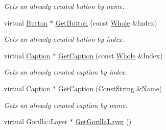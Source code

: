 \begin{DoxyCompactItemize}
\begin{DoxyCompactList}\small\item\em Gets an already created button by name. \item\end{DoxyCompactList}\item 
virtual \hyperlink{classMezzanine_1_1UI_1_1Button}{Button} $\ast$ \hyperlink{classMezzanine_1_1UI_1_1Layer_acfbea2afd6cf9a1509d72d39715ebf05}{GetButton} (const \hyperlink{namespaceMezzanine_adcbb6ce6d1eb4379d109e51171e2e493}{Whole} \&Index)
\begin{DoxyCompactList}\small\item\em Gets an already created button by index. \item\end{DoxyCompactList}\item 
virtual \hyperlink{classMezzanine_1_1UI_1_1Caption}{Caption} $\ast$ \hyperlink{classMezzanine_1_1UI_1_1Layer_a0e85f5557ad863eefa81dd42ca9eb45d}{GetCaption} (const \hyperlink{namespaceMezzanine_adcbb6ce6d1eb4379d109e51171e2e493}{Whole} \&Index)
\begin{DoxyCompactList}\small\item\em Gets an already created caption by index. \item\end{DoxyCompactList}\item 
virtual \hyperlink{classMezzanine_1_1UI_1_1Caption}{Caption} $\ast$ \hyperlink{classMezzanine_1_1UI_1_1Layer_ad862a32c94f66dbc749575bb103fc0db}{GetCaption} (\hyperlink{namespaceMezzanine_a63cd699ac54b73953f35ec9cfc05e506}{ConstString} \&Name)
\begin{DoxyCompactList}\small\item\em Gets an already created caption by name. \item\end{DoxyCompactList}\item 
\hypertarget{classMezzanine_1_1UI_1_1Layer_a8874a9808f01e5db6e323c3010a5a076}{
virtual Gorilla::Layer $\ast$ \hyperlink{classMezzanine_1_1UI_1_1Layer_a8874a9808f01e5db6e323c3010a5a076}{GetGorillaLayer} ()}
\label{classMezzanine_1_1UI_1_1Layer_a8874a9808f01e5db6e323c3010a5a076}


\end{DoxyCompactItemize}

